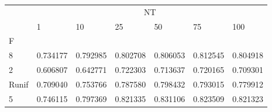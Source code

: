 \begin{table}[htbp]
\centering
\label{heart-results}
\begin{tabular}{lllllll}
\toprule
 & \multicolumn{6}{c}{NT} \\
 & 1 & 10 & 25 & 50 & 75 & 100 \\
F &  &  &  &  &  &  \\
\midrule
8 & 0.734177 & 0.792985 & 0.802708 & 0.806053 & 0.812545 & 0.804918 \\
2 & 0.606807 & 0.642771 & 0.722303 & 0.713637 & 0.720165 & 0.709301 \\
Runif & 0.709040 & 0.753766 & 0.787580 & 0.798432 & 0.793015 & 0.779912 \\
5 & 0.746115 & 0.797369 & 0.821335 & 0.831106 & 0.823509 & 0.821323 \\
\bottomrule
\end{tabular}
\end{table}
